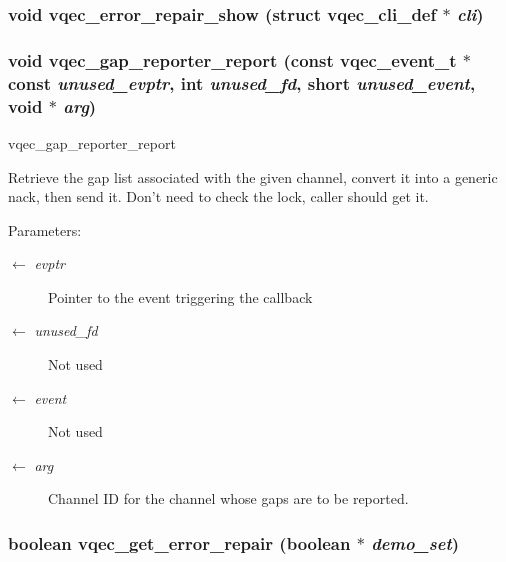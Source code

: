 \subsubsection{\setlength{\rightskip}{0pt plus 5cm}void vqec\_\-error\_\-repair\_\-show (struct \bf{vqec\_\-cli\_\-def} $\ast$ {\em cli})}\label{vqec__gap__reporter_8h_b83b1ce321d896bcf90497941b7fe610}


\subsubsection{\setlength{\rightskip}{0pt plus 5cm}void vqec\_\-gap\_\-reporter\_\-report (const vqec\_\-event\_\-t $\ast$const  {\em unused\_\-evptr}, int {\em unused\_\-fd}, short {\em unused\_\-event}, void $\ast$ {\em arg})}\label{vqec__gap__reporter_8h_4118b63bf5c15fbf724e5bbab6982c42}


vqec\_\-gap\_\-reporter\_\-report

Retrieve the gap list associated with the given channel, convert it into a generic nack, then send it. Don't need to check the lock, caller should get it.

\begin{Desc}
\item[Parameters:]
\begin{description}
\item[\mbox{$\leftarrow$} {\em evptr}]Pointer to the event triggering the callback \item[\mbox{$\leftarrow$} {\em unused\_\-fd}]Not used \item[\mbox{$\leftarrow$} {\em event}]Not used \item[\mbox{$\leftarrow$} {\em arg}]Channel ID for the channel whose gaps are to be reported. \end{description}
\end{Desc}
\subsubsection{\setlength{\rightskip}{0pt plus 5cm}boolean vqec\_\-get\_\-error\_\-repair (boolean $\ast$ {\em demo\_\-set})}\label{vqec__gap__reporter_8h_911bd113de88cc1e99ae67e17ce3b3e2}


